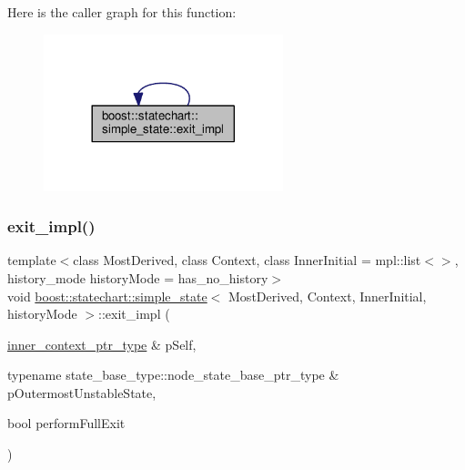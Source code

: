 Here is the caller graph for this function\+:
\nopagebreak
\begin{figure}[H]
\begin{center}
\leavevmode
\includegraphics[width=197pt]{classboost_1_1statechart_1_1simple__state_a82e8a0fa7183343e0513e97eb704fdee_icgraph}
\end{center}
\end{figure}
\mbox{\label{classboost_1_1statechart_1_1simple__state_a480ae5f0e110cb8208bed7b25891dc17}} 
\subsubsection{\texorpdfstring{exit\+\_\+impl()}{exit\_impl()}\hspace{0.1cm}{\footnotesize\ttfamily [2/2]}}
{\footnotesize\ttfamily template$<$class Most\+Derived, class Context, class Inner\+Initial = mpl\+::list$<$$>$, history\+\_\+mode history\+Mode = has\+\_\+no\+\_\+history$>$ \\
void \mbox{\hyperlink{classboost_1_1statechart_1_1simple__state}{boost\+::statechart\+::simple\+\_\+state}}$<$ Most\+Derived, Context, Inner\+Initial, history\+Mode $>$\+::exit\+\_\+impl (\begin{DoxyParamCaption}\item[{\mbox{\hyperlink{classboost_1_1statechart_1_1simple__state_ad6d3233a11a23e91b4cc9edcae799379}{inner\+\_\+context\+\_\+ptr\+\_\+type}} \&}]{p\+Self,  }\item[{typename state\+\_\+base\+\_\+type\+::node\+\_\+state\+\_\+base\+\_\+ptr\+\_\+type \&}]{p\+Outermost\+Unstable\+State,  }\item[{bool}]{perform\+Full\+Exit }\end{DoxyParamCaption})\hspace{0.3cm}{\ttfamily [inline]}}

